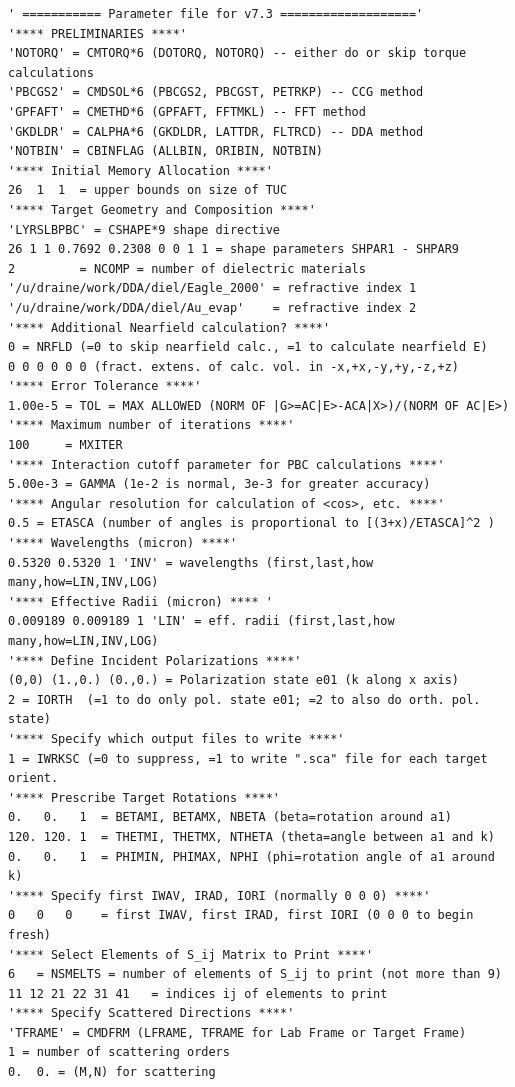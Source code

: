 {\footnotesize\begin{verbatim}
' =========== Parameter file for v7.3 ===================' 
'**** PRELIMINARIES ****'
'NOTORQ' = CMTORQ*6 (DOTORQ, NOTORQ) -- either do or skip torque calculations
'PBCGS2' = CMDSOL*6 (PBCGS2, PBCGST, PETRKP) -- CCG method
'GPFAFT' = CMETHD*6 (GPFAFT, FFTMKL) -- FFT method
'GKDLDR' = CALPHA*6 (GKDLDR, LATTDR, FLTRCD) -- DDA method
'NOTBIN' = CBINFLAG (ALLBIN, ORIBIN, NOTBIN)
'**** Initial Memory Allocation ****'
26  1  1  = upper bounds on size of TUC 
'**** Target Geometry and Composition ****'
'LYRSLBPBC' = CSHAPE*9 shape directive
26 1 1 0.7692 0.2308 0 0 1 1 = shape parameters SHPAR1 - SHPAR9
2         = NCOMP = number of dielectric materials
'/u/draine/work/DDA/diel/Eagle_2000' = refractive index 1
'/u/draine/work/DDA/diel/Au_evap'    = refractive index 2
'**** Additional Nearfield calculation? ****'
0 = NRFLD (=0 to skip nearfield calc., =1 to calculate nearfield E)
0 0 0 0 0 0 (fract. extens. of calc. vol. in -x,+x,-y,+y,-z,+z)
'**** Error Tolerance ****'
1.00e-5 = TOL = MAX ALLOWED (NORM OF |G>=AC|E>-ACA|X>)/(NORM OF AC|E>)
'**** Maximum number of iterations ****'
100     = MXITER
'**** Interaction cutoff parameter for PBC calculations ****'
5.00e-3 = GAMMA (1e-2 is normal, 3e-3 for greater accuracy)
'**** Angular resolution for calculation of <cos>, etc. ****'
0.5	= ETASCA (number of angles is proportional to [(3+x)/ETASCA]^2 )
'**** Wavelengths (micron) ****'
0.5320 0.5320 1 'INV' = wavelengths (first,last,how many,how=LIN,INV,LOG)
'**** Effective Radii (micron) **** '
0.009189 0.009189 1 'LIN' = eff. radii (first,last,how many,how=LIN,INV,LOG)
'**** Define Incident Polarizations ****'
(0,0) (1.,0.) (0.,0.) = Polarization state e01 (k along x axis)
2 = IORTH  (=1 to do only pol. state e01; =2 to also do orth. pol. state)
'**** Specify which output files to write ****'
1 = IWRKSC (=0 to suppress, =1 to write ".sca" file for each target orient.
'**** Prescribe Target Rotations ****'
0.   0.   1  = BETAMI, BETAMX, NBETA (beta=rotation around a1)
120. 120. 1  = THETMI, THETMX, NTHETA (theta=angle between a1 and k)
0.   0.   1  = PHIMIN, PHIMAX, NPHI (phi=rotation angle of a1 around k)
'**** Specify first IWAV, IRAD, IORI (normally 0 0 0) ****'
0   0   0    = first IWAV, first IRAD, first IORI (0 0 0 to begin fresh)
'**** Select Elements of S_ij Matrix to Print ****'
6	= NSMELTS = number of elements of S_ij to print (not more than 9)
11 12 21 22 31 41	= indices ij of elements to print
'**** Specify Scattered Directions ****'
'TFRAME' = CMDFRM (LFRAME, TFRAME for Lab Frame or Target Frame)
1 = number of scattering orders
0.  0. = (M,N) for scattering
\end{verbatim}}
